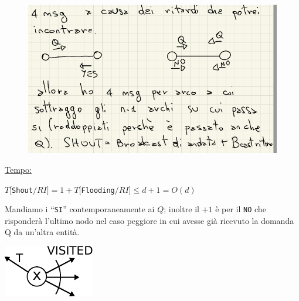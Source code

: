 \begin{figure}[H]
    \centering
    \includegraphics[width=\linewidth, keepaspectratio]{capitoli/costruzione-spanning-tree/imgs/hh}
\end{figure}

\underline{Tempo:}
\begin{center}
    $T[$\texttt{Shout}$/RI] = 1 + T[$\texttt{Flooding}$/RI] \leq d + 1 = O(d)$
\end{center}
Mandiamo i ``\texttt{SI}'' contemporaneamente ai $Q$; inoltre il $+1$ è per il
\texttt{NO} che risponderà l'ultimo nodo nel caso peggiore in cui avesse già
ricevuto la domanda Q da un'altra entità.

\begin{center}
    \includegraphics[scale=1]{capitoli/costruzione-spanning-tree/imgs/n_22}
\end{center}

